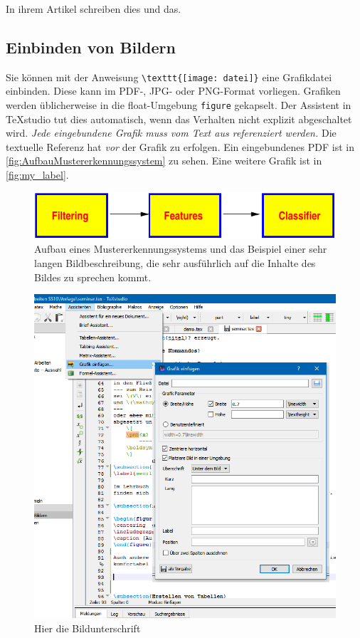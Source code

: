 In ihrem Artikel \autocite[S. 18]{Oechsner2015} schreiben \citeauthor{Oechsner2015} dies und das.


\subsection{Einbinden von Bildern}

Sie können mit der Anweisung \lstinline|\texttt{[image: datei]}| eine Grafikdatei einbinden. Diese kann im PDF-, JPG- oder PNG-Format vorliegen. Grafiken werden üblicherweise in die float-Umgebung \lstinline|figure| gekapselt. Der Assistent in TeXstudio \autocite{vanderZander2018} tut dies automatisch, wenn das Verhalten nicht explizit abgeschaltet wird. \textit{Jede eingebundene Grafik muss vom Text aus referenziert werden.} Die textuelle Referenz hat \textit{vor} der Grafik zu erfolgen. Ein eingebundenes PDF ist in \autoref{fig:AufbauMustererkennungssystem} zu sehen. Eine weitere Grafik ist in \autoref{fig:my_label}.

\begin{figure}
\centering
\includegraphics [width=0.5\linewidth] {bilder/bildchen.pdf}
\caption [Aufbau eines Mustererkennungssystems]{Aufbau eines Mustererkennungssystems und das Beispiel einer sehr langen Bildbeschreibung, die sehr ausführlich auf die Inhalte des Bildes zu sprechen kommt. \autocite{Oechsner2015}}
\label{fig:AufbauMustererkennungssystem}
\end{figure}

\begin{figure}
    \centering
    \includegraphics[width=0.5\linewidth] {bilder/GrafikEinfuegen.png}
    \caption{Hier die Bildunterschrift}
    \label{fig:my_label}
\end{figure}

